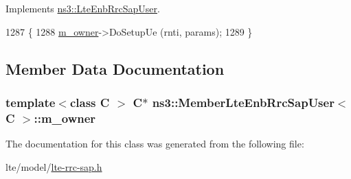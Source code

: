 Implements \hyperlink{classns3_1_1LteEnbRrcSapUser_a4b99011d412999337fdc84f8f3876870}{ns3\+::\+Lte\+Enb\+Rrc\+Sap\+User}.


\begin{DoxyCode}
1287 \{
1288   \hyperlink{classns3_1_1MemberLteEnbRrcSapUser_a1e43e64be435887037c354d6ca15083c}{m\_owner}->DoSetupUe (rnti, params);
1289 \}
\end{DoxyCode}


\subsection{Member Data Documentation}
\subsubsection[{\texorpdfstring{m\+\_\+owner}{m_owner}}]{\setlength{\rightskip}{0pt plus 5cm}template$<$class C $>$ {\bf C}$\ast$ {\bf ns3\+::\+Member\+Lte\+Enb\+Rrc\+Sap\+User}$<$ {\bf C} $>$\+::m\+\_\+owner\hspace{0.3cm}{\ttfamily [private]}}\hypertarget{classns3_1_1MemberLteEnbRrcSapUser_a1e43e64be435887037c354d6ca15083c}{}\label{classns3_1_1MemberLteEnbRrcSapUser_a1e43e64be435887037c354d6ca15083c}


The documentation for this class was generated from the following file\+:\begin{DoxyCompactItemize}
\item 
lte/model/\hyperlink{lte-rrc-sap_8h}{lte-\/rrc-\/sap.\+h}\end{DoxyCompactItemize}
